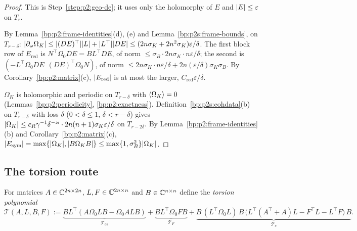 \begin{proof}
\label{step:p2s:geo-de}
This is Step~\ref{step:p2:geo-de}; it uses only the holomorphy of $E$ and $\lvert E\rvert\le\varepsilon$ on $T_r$.

\label{step:p2s:geo-dom}
By Lemma~\ref{bp:p2:frame-identities}(d), (e) and Lemma~\ref{bp:p2s:frame-bounds}, on $T_{r-\delta}$:
$\lvert \partial_\omega\Omega_K\rvert\le\lvert (DE)^\top\rvert\lvert L\rvert+\lvert L^\top\rvert\lvert DE\rvert\le(2n\sigma_K+2n^2\sigma_K)\varepsilon/\delta$. The first block
row of $E_{\mathrm{red}}$ is $N^\top\Omega_0DE=BL^\top DE$, of norm $\le\sigma_B\cdot2n\sigma_K\cdot n\varepsilon/\delta$; the second is
$(-L^\top\Omega_0DE\ \ (DE)^\top\Omega_0N)$, of norm $\le2n\sigma_K\cdot n\varepsilon/\delta+2n(\varepsilon/\delta)\sigma_K\sigma_B$. By
Corollary~\ref{bp:p2:matrix}(c), $\lvert E_{\mathrm{red}}\rvert$ is at most the larger, $C_{\mathrm{red}}\varepsilon/\delta$.

\label{step:p2s:geo-om}
$\Omega_K$ is holomorphic and periodic on $T_{r-\delta}$ with $\langle \Omega_K\rangle=0$ (Lemmas~\ref{bp:p2:periodicity},
\ref{bp:p2:exactness}). Definition~\ref{bp:p2s:cohdata}(b) on $T_{r-\delta}$ with loss $\delta$ ($0<\delta\le1$,
$\delta<r-\delta$) gives $\lvert \Omega_K\rvert\le c_R\gamma^{-1}\delta^{-\varkappa}\cdot2n(n+1)\sigma_K\varepsilon/\delta$ on $T_{r-2\delta}$. By
Lemma~\ref{bp:p2:frame-identities}(b) and Corollary~\ref{bp:p2:matrix}(c),
$\lvert E_{\mathrm{sym}}\rvert=\max\{\lvert \Omega_K\rvert,\lvert B\Omega_KB\rvert\}\le\max\{1,\sigma_B^2\}\lvert \Omega_K\rvert$.
\end{proof}

\subsection{The torsion route}\label{bp:p2s:sec-torsion}

For matrices $A\in\mathbb{C}^{2n\times2n}$, $L,F\in\mathbb{C}^{2n\times n}$ and $B\in\mathbb{C}^{n\times n}$ define the \emph{torsion
polynomial}
\[
\mathcal T(A,L,B,F):=\underbrace{BL^\top(A\Omega_0LB-\Omega_0ALB)}_{\mathcal T_{ab}}+\underbrace{BL^\top\Omega_0FB}_{\mathcal T_F}
+\underbrace{B\,(L^\top\Omega_0L)\,B\,\bigl(L^\top(A^\top+A)L-F^\top L-L^\top F\bigr)\,B}_{\mathcal T_c}.
\]

